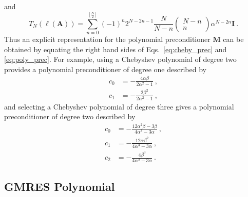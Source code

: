 \documentclass[10pt]{article}
\newcommand{\bA}{\ensuremath{\mathbf{A}}}
\newcommand{\bM}{\ensuremath{\mathbf{M}}}
\newcommand{\bI}{\ensuremath{\mathbf{I}}}
\begin{document}
and
\begin{equation}
T_N \left( \ell(\bA) \right) = \sum_{n=0}^{\lfloor \frac{N}{2} \rfloor} \left( -1 \right)^n 2^{N - 2n -1} \frac{N}{N-n}
\begin{pmatrix} N-n \\ n \end{pmatrix} \alpha^{N-2n} \bI \:.
\end{equation}
Thus an explicit representation for the polynomial preconditioner $\bM$ can
be obtained by equating the right hand sides of Eqs.~\eqref{eq:cheby_prec}
and \eqref{eq:poly_prec}.  For example, using a Chebyshev polynomial of
degree two provides a polynomial preconditioner of degree one described by
\begin{equation}
\begin{aligned}
c_0 &= - \frac{4 \alpha \beta}{2 \alpha^2 -1} \:, \\
c_1 &= - \frac{2 \beta^2}{2 \alpha^2 - 1} \:,
\end{aligned}
\end{equation}
and selecting a Chebyshev polynomial of degree three gives a polynomial
preconditioner of degree two described by
\begin{equation}
\begin{aligned}
c_0 &= - \frac{12 \alpha^2 \beta - 3 \beta}{4 \alpha^3 - 3 \alpha} \:, \\
c_1 &= - \frac{12 \alpha \beta^2}{4 \alpha^3 - 3 \alpha} \:, \\
c_2 &= - \frac{4 \beta^3}{4 \alpha^3 - 3 \alpha} \:.
\end{aligned}
\end{equation}

\subsection{GMRES Polynomial}
\label{subsec:gmres}
\end{document}
